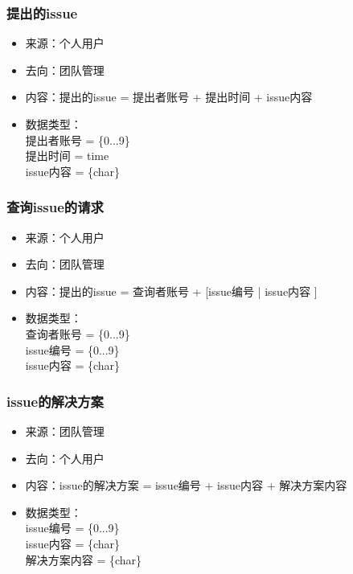 {            \subsubsection{\color{red} 提出的issue}
            \begin{itemize}
                \item 来源：个人用户
                \item 去向：团队管理
                \item 内容：提出的issue = 提出者账号 + 提出时间 + issue内容
                \item 数据类型：\\
                    提出者账号 = \{0...9\}\\
                    提出时间 = time\\
                    issue内容 = \{char\}\\
            \end{itemize}
            \subsubsection{\color{red} 查询issue的请求}
            \begin{itemize}
                \item 来源：个人用户
                \item 去向：团队管理
                \item 内容：提出的issue = 查询者账号 + [issue编号 | issue内容 ]
                \item 数据类型：\\
                    查询者账号 = \{0...9\}\\
                    issue编号 = \{0...9\}\\
                    issue内容 = \{char\}\\
            \end{itemize}
            \subsubsection{\color{red} issue的解决方案}
            \begin{itemize}
                \item 来源：团队管理
                \item 去向：个人用户
                \item 内容：issue的解决方案 = issue编号 + issue内容 + 解决方案内容
                \item 数据类型：\\
                    issue编号 = \{0...9\}\\
                    issue内容 = \{char\}\\
                    解决方案内容 = \{char\}\\
            \end{itemize}
}
